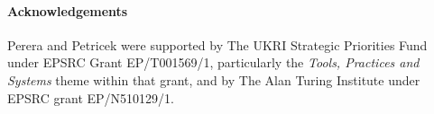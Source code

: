 \makeatletter%
\if@ACM@anonymous%
\else%
\paragraph{Acknowledgements}

Perera and Petricek were supported by The UKRI Strategic Priorities Fund under EPSRC Grant EP/T001569/1, particularly the \emph{Tools, Practices and Systems} theme within that grant, and by The Alan Turing Institute under EPSRC grant EP/N510129/1.
\fi%
\makeatother%
